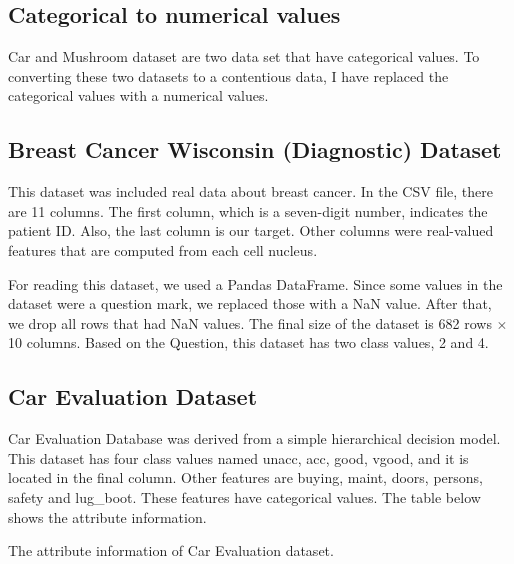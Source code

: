 \subsection{Categorical to numerical values}
Car and Mushroom dataset are two data set that have categorical values. To converting these two datasets to a contentious data, I have replaced the categorical values with a numerical values. 




\subsection{Breast Cancer Wisconsin (Diagnostic) Dataset}

This dataset was included real data about breast cancer. In the CSV file, there are 11 columns. The first column, which is a seven-digit number, indicates the patient ID. Also, the last column is our target. Other columns were real-valued features that are computed from each cell nucleus. 

For reading this dataset, we used a Pandas DataFrame. Since some values in the dataset were a question mark, we replaced those with a NaN value. After that, we drop all rows that had NaN values. The final size of the dataset is 682 rows $\times$ 10 columns. Based on the Question, this dataset has two class values, 2 and 4.









\subsection{Car Evaluation Dataset}

Car Evaluation Database was derived from a simple hierarchical decision model. This dataset has four class values named unacc, acc, good, vgood, and it is located in the final column. Other features are buying, maint, doors, persons, safety and lug\_boot. These features have categorical values. The table below shows the attribute information.  


\begin{table}[H]
\centering
\caption{The attribute information of Car Evaluation dataset.}
\label{tab:tab_1}

\end{table}

